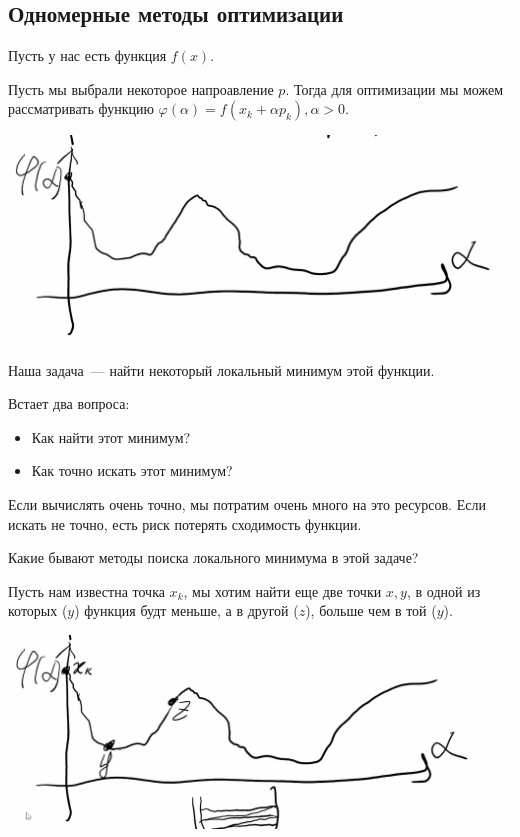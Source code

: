 \subsection{Одномерные методы оптимизации}

Пусть у нас есть функция $f(x)$.

Пусть мы выбрали некоторое напроавление $p$.
Тогда для оптимизации мы можем рассматривать функцию
$\varphi(\alpha) = f(x_k+ \alpha p_k), \alpha > 0$.

\begin{center}
    \includegraphics[scale=0.5]{img/methopt_one_dimensional_optimization_f_proect}
\end{center}

Наша задача~--- найти некоторый локальный минимум этой функции.

Встает два вопроса:
\begin{itemize}
    \item Как найти этот минимум?
    \item Как точно искать этот минимум?
\end{itemize}

Если вычислять очень точно, мы потратим очень много на это ресурсов.
Если искать не точно, есть риск потерять сходимость функции.

Какие бывают методы поиска локального минимума в этой задаче?

Пусть нам известна точка $x_k$, мы хотим найти еще две точки $x, y$, в одной из которых ($y$) функция будт меньше, а в другой ($z$), больше чем в той ($y$).

\begin{center}
    \includegraphics[scale=0.5]{img/methopt_one_dimensional_optimization_f_proect_points}
\end{center}

